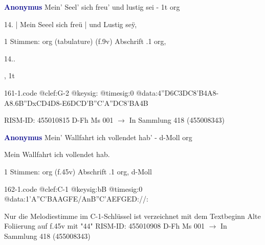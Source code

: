 \documentclass[twocolumn]{book}
\begin{document}
\newline \par \vspace{7pt} \textcolor{darkblue}{\textbf{Anonymus  }}
\newline Mein' Seel' sich freu' und lustig sei - 1t
\newline org
\newline \begin{itshape}[f.9v, at left:] 14. | Mein Seeel sich freü | und Lustig seÿ,\end{itshape} 
\newline \textcolor{darkblue}{}  1 Stimmen: org (tabulature)  (f.9v)
\newline Abschrift
.1  org, \begin{itshape}14..\end{itshape}, 1t  
\begin{filecontents*}{161-1.code}
@clef:G-2
@keysig:
@timesig:0
@data:4''D{6C3DC8'B}4A8-A{8.6B''DxCD}4D8-E{6DCD'B}{''C'A''DC}{8'BA}4B
\end{filecontents*}
\newline
%
\newline RISM-ID: 455010815
\newline D-Fh  Ms 001
\newline $\rightarrow$ In Sammlung 418 (455008343)
      
\newline \par \vspace{7pt} \textcolor{darkblue}{\textbf{Anonymus  }}
\newline Mein' Wallfahrt ich vollendet hab' - d-Moll
\newline org
\newline \begin{itshape}[f.45v, at left:] Mein Wallfahrt ich vollendet hab.\end{itshape} 
\newline \textcolor{darkblue}{}  1 Stimmen: org  (f.45v)
\newline Abschrift
.1  org, d-Moll  
\begin{filecontents*}{162-1.code}
@clef:C-1
@keysig:bB
@timesig:0
@data:1'A''C'BAAGFE/AnB''C'AEFGED://:
\end{filecontents*}
\newline
%
\newline Nur die Melodiestimme im C-1-Schlüssel ist verzeichnet mit dem Textbeginn
\newline Alte Foliierung auf f.45v mit "44"
\newline RISM-ID: 455010908
\newline D-Fh  Ms 001
\newline $\rightarrow$ In Sammlung 418 (455008343)
      
\end{document}
